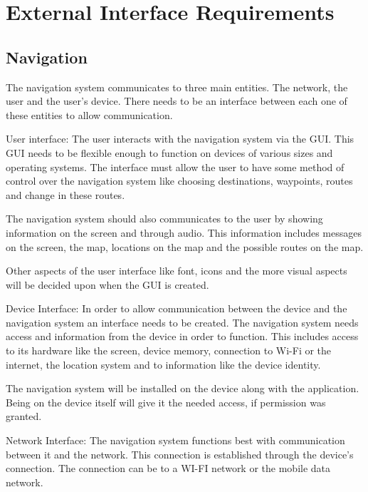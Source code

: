 \documentclass[runningheads,a4paper]{article}
\begin{document}
\begingroup



\tableofcontents


\endgroup

\newpage




\section{External Interface Requirements}
\subsection {Navigation}
The navigation system communicates to three main entities. The network, the user and the user’s device. There needs to be an interface 
between each one of these entities to allow communication. 

User interface: 
The user interacts with the navigation system via the GUI. This GUI needs to be flexible enough to function on devices of various sizes 
and operating systems. The interface must allow the user to have some method of control over the navigation system like choosing 
destinations, waypoints, routes and change in these routes. 

The navigation system should also communicates to the user by showing information on the screen and through audio. This information
includes messages on the screen, the map, locations on the map and the possible routes on the map.

Other aspects of the user interface like font, icons and the more visual aspects will be decided upon when the GUI is created.

Device Interface:
In order to allow communication between the device and the navigation system an interface needs to be created. The navigation system 
needs access and information from the device in order to function. This includes access to its hardware like the screen, 
device memory, connection to Wi-Fi or the internet, the location system and to information like the device identity. 

The navigation system will be installed on the device along with the application. Being on the device itself will give it the needed
access, if permission was granted. 

Network Interface:
The navigation system functions best with communication between it and the network. This connection is established through the device’s 
connection. The connection can be to a WI-FI network or the mobile data network. 
\end{document}
